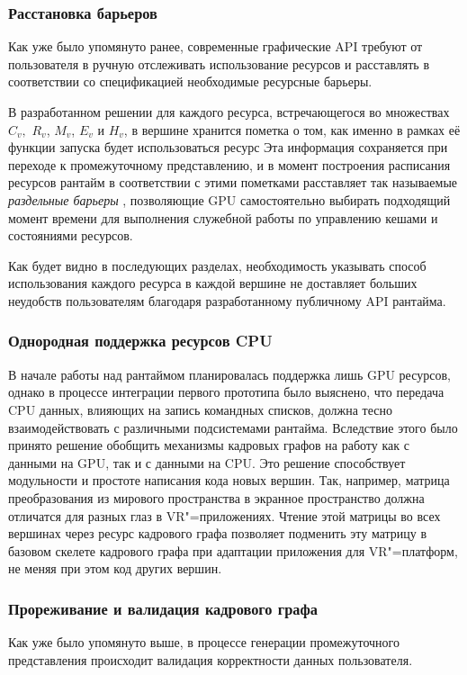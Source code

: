 \subsubsection{Расстановка барьеров}
Как уже было упомянуто ранее, современные графические API требуют от пользователя в ручную отслеживать использование ресурсов и расставлять в соответствии со спецификацией необходимые ресурсные барьеры.

В разработанном решении для каждого ресурса, встречающегося во множествах $C_v,$ $R_v$, $M_v$, $E_v$ и $H_v$, в вершине хранится пометка о том, как именно в рамках её функции запуска будет использоваться ресурс
Эта информация сохраняется при переходе к промежуточному представлению, и в момент построения расписания ресурсов рантайм в соответствии с этими пометками расставляет так называемые \textit{раздельные барьеры} \cite[раздел~7.5]{VulkanSpec}, позволяющие GPU самостоятельно выбирать подходящий момент времени для выполнения служебной работы по управлению кешами и состояниями ресурсов.

Как будет видно в последующих разделах, необходимость указывать способ использования каждого ресурса в каждой вершине не доставляет больших неудобств пользователям благодаря разработанному публичному API рантайма.

\subsubsection{Однородная поддержка ресурсов CPU}
В начале работы над рантаймом планировалась поддержка лишь GPU ресурсов, однако в процессе интеграции первого прототипа было выяснено, что передача CPU данных, влияющих на запись командных списков, должна тесно взаимодействовать с различными подсистемами рантайма.
Вследствие этого было принято решение обобщить механизмы кадровых графов на работу как с данными на GPU, так и с данными на CPU.
Это решение способствует модульности и простоте написания кода новых вершин.
Так, например, матрица преобразования из мирового пространства в экранное пространство должна отличатся для разных глаз в VR"=приложениях.
Чтение этой матрицы во всех вершинах через ресурс кадрового графа позволяет подменить эту матрицу в базовом скелете кадрового графа при адаптации приложения для VR"=платформ, не меняя при этом код других вершин.

\subsubsection{Прореживание и валидация кадрового графа}
Как уже было упомянуто выше, в процессе генерации промежуточного представления происходит валидация корректности данных пользователя.


